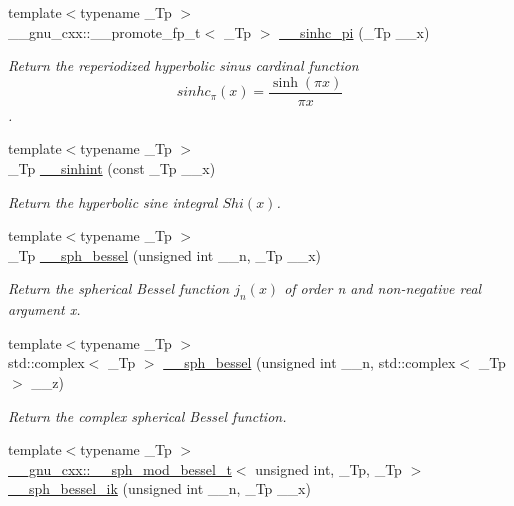 \begin{DoxyCompactItemize}
{\footnotesize template$<$typename \+\_\+\+Tp $>$ }\\\+\_\+\+\_\+gnu\+\_\+cxx\+::\+\_\+\+\_\+promote\+\_\+fp\+\_\+t$<$ \+\_\+\+Tp $>$ \hyperlink{namespacestd_1_1____detail_adcb7d17819902a9b4fa0bd5543dd3f6b}{\+\_\+\+\_\+sinhc\+\_\+pi} (\+\_\+\+Tp \+\_\+\+\_\+x)
\begin{DoxyCompactList}\small\item\em Return the reperiodized hyperbolic sinus cardinal function \[ sinhc_\pi(x) = \frac{\sinh(\pi x)}{\pi x} \]. \end{DoxyCompactList}\item 
{\footnotesize template$<$typename \+\_\+\+Tp $>$ }\\\+\_\+\+Tp \hyperlink{namespacestd_1_1____detail_ac629f9c743a716608af2007d2e34438d}{\+\_\+\+\_\+sinhint} (const \+\_\+\+Tp \+\_\+\+\_\+x)
\begin{DoxyCompactList}\small\item\em Return the hyperbolic sine integral $ Shi(x) $. \end{DoxyCompactList}\item 
{\footnotesize template$<$typename \+\_\+\+Tp $>$ }\\\+\_\+\+Tp \hyperlink{namespacestd_1_1____detail_ac2ae8a144f79bd793e1b5d80a3b082b1}{\+\_\+\+\_\+sph\+\_\+bessel} (unsigned int \+\_\+\+\_\+n, \+\_\+\+Tp \+\_\+\+\_\+x)
\begin{DoxyCompactList}\small\item\em Return the spherical Bessel function $ j_n(x) $ of order n and non-\/negative real argument {\ttfamily x}. \end{DoxyCompactList}\item 
{\footnotesize template$<$typename \+\_\+\+Tp $>$ }\\std\+::complex$<$ \+\_\+\+Tp $>$ \hyperlink{namespacestd_1_1____detail_a28646bd01903e6da9871069a9363c593}{\+\_\+\+\_\+sph\+\_\+bessel} (unsigned int \+\_\+\+\_\+n, std\+::complex$<$ \+\_\+\+Tp $>$ \+\_\+\+\_\+z)
\begin{DoxyCompactList}\small\item\em Return the complex spherical Bessel function. \end{DoxyCompactList}\item 
{\footnotesize template$<$typename \+\_\+\+Tp $>$ }\\\hyperlink{struct____gnu__cxx_1_1____sph__mod__bessel__t}{\+\_\+\+\_\+gnu\+\_\+cxx\+::\+\_\+\+\_\+sph\+\_\+mod\+\_\+bessel\+\_\+t}$<$ unsigned int, \+\_\+\+Tp, \+\_\+\+Tp $>$ \hyperlink{namespacestd_1_1____detail_ad6abfd6ff1313354333c57e7b4c7b34c}{\+\_\+\+\_\+sph\+\_\+bessel\+\_\+ik} (unsigned int \+\_\+\+\_\+n, \+\_\+\+Tp \+\_\+\+\_\+x)

\end{DoxyCompactItemize}
